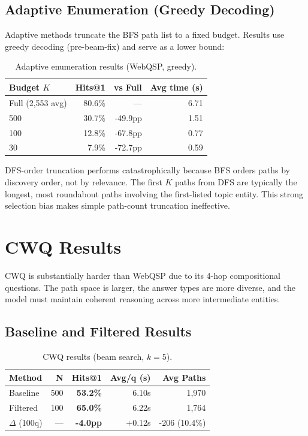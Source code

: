 \documentclass[11pt,twoside]{article}
\begin{document}
\subsection{Adaptive Enumeration (Greedy Decoding)}

Adaptive methods truncate the BFS path list to a fixed budget. Results use
greedy decoding (pre-beam-fix) and serve as a lower bound:

\begin{table}[H]
  \centering
  \caption{Adaptive enumeration results (WebQSP, greedy).}
  \label{tab:adaptive}
  \begin{tabular}{lrrr}
    \toprule
    \textbf{Budget \(K\)} & \textbf{Hits@1} & \textbf{vs Full} & \textbf{Avg time (s)} \\
    \midrule
    Full (2,553 avg) & 80.6\% & --- & 6.71 \\
    500 & 30.7\% & -49.9pp & 1.51 \\
    100 & 12.8\% & -67.8pp & 0.77 \\
    30 & 7.9\% & -72.7pp & 0.59 \\
    \bottomrule
  \end{tabular}
\end{table}

DFS-order truncation performs catastrophically because BFS orders paths by
discovery order, not by relevance. The first \(K\) paths from DFS are typically
the longest, most roundabout paths involving the first-listed topic entity. This strong
selection bias makes simple path-count truncation ineffective.

\section{CWQ Results}
\label{sec:cwq}

CWQ is substantially harder than WebQSP due to its 4-hop compositional
questions. The path space is larger, the answer types are more diverse, and the
model must maintain coherent reasoning across more intermediate entities.

\subsection{Baseline and Filtered Results}

\begin{table}[H]
  \centering
  \caption{CWQ results (beam search, \(k=5\)).}
  \label{tab:cwq-main}
  \begin{tabular}{lrrrr}
    \toprule
    \textbf{Method} & \textbf{N} & \textbf{Hits@1} & \textbf{Avg/q (s)} & \textbf{Avg Paths} \\
    \midrule
    Baseline & 500 & \textbf{53.2\%} & 6.10s & 1,970 \\
    Filtered & 100 & \textbf{65.0\%} & 6.22s & 1,764 \\
    \(\Delta\) (100q) & --- & \textbf{-4.0pp} & +0.12s & -206 (10.4\%) \\
    \bottomrule
  \end{tabular}
\end{table}
\end{document}
